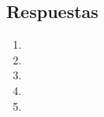 \documentclass{article}
\begin{document}
\subsection*{Respuestas}

\begin{enumerate}[label=\alph*)]
	\item
	\item
	\item
	\item
	\item
\end{enumerate}
\end{document}
